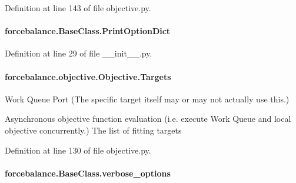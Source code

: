 Definition at line 143 of file objective.\-py.

\hypertarget{classforcebalance_1_1BaseClass_afc6659278497d7245bc492ecf405ccae}{
\paragraph[{Print\-Option\-Dict}]{\setlength{\rightskip}{0pt plus 5cm}forcebalance.\-Base\-Class.\-Print\-Option\-Dict\hspace{0.3cm}{\ttfamily [inherited]}}}\label{classforcebalance_1_1BaseClass_afc6659278497d7245bc492ecf405ccae}


Definition at line 29 of file \-\_\-\-\_\-init\-\_\-\-\_\-.\-py.

\hypertarget{classforcebalance_1_1objective_1_1Objective_a20e0d09fb2b889b5f604e75a020601a8}{
\paragraph[{Targets}]{\setlength{\rightskip}{0pt plus 5cm}forcebalance.\-objective.\-Objective.\-Targets}}\label{classforcebalance_1_1objective_1_1Objective_a20e0d09fb2b889b5f604e75a020601a8}


Work Queue Port (The specific target itself may or may not actually use this.) 

Asynchronous objective function evaluation (i.\-e. execute Work Queue and local objective concurrently.) The list of fitting targets 

Definition at line 130 of file objective.\-py.

\hypertarget{classforcebalance_1_1BaseClass_afd68efa29ccd2f320f4cf82198214aac}{
\paragraph[{verbose\-\_\-options}]{\setlength{\rightskip}{0pt plus 5cm}forcebalance.\-Base\-Class.\-verbose\-\_\-options\hspace{0.3cm}{\ttfamily [inherited]}}}\label{classforcebalance_1_1BaseClass_afd68efa29ccd2f320f4cf82198214aac}


